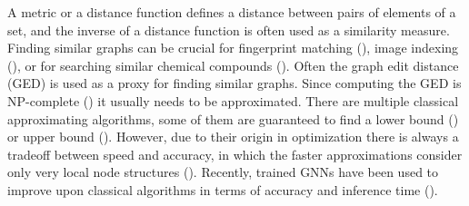 A metric or a distance function defines a distance between pairs of elements of a set, and the inverse of a distance function is often used as a similarity measure. Finding similar graphs can be crucial for fingerprint matching (\citealp{fingerprint2005}), image indexing (\citealp{image_index2008}), or for searching similar chemical compounds (\citealp{chem2006}). Often the graph edit distance (GED) is used as a proxy for finding similar graphs. Since computing the GED is NP-complete (\citealp{np_complete1998}) it usually needs to be approximated. There are multiple classical approximating algorithms, some of them are guaranteed to find a lower bound (\citealp{hungarian2009}) or upper bound (\citealp{hed2015}). However, due to their origin in optimization there is always a tradeoff between speed and accuracy, in which the faster approximations consider only very local node structures (\citealp{hungarian2009}). Recently, trained GNNs have been used to improve upon classical algorithms in terms of accuracy and inference time (\citealp{bai2019}). %
